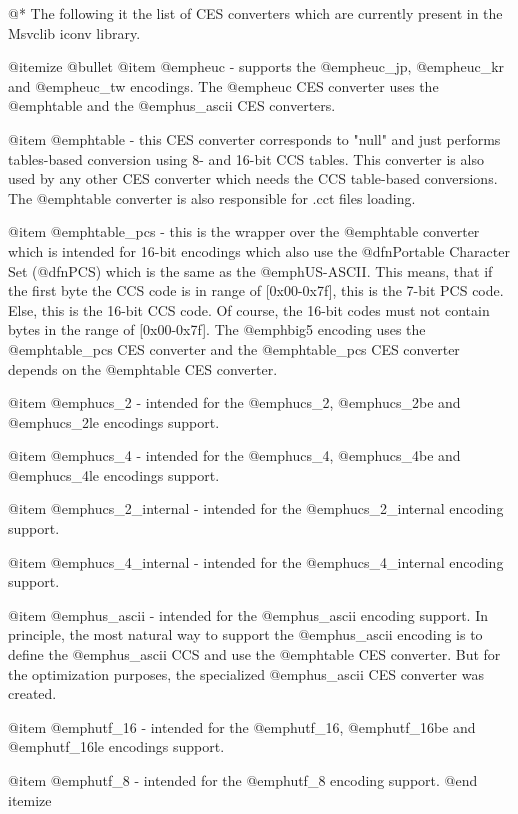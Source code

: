 @*
The following it the list of CES converters which are currently present
in the Msvclib iconv library.

@itemize @bullet
@item
@emph{euc} - supports the @emph{euc_jp}, @emph{euc_kr} and @emph{euc_tw}
encodings. The @emph{euc} CES converter uses the @emph{table} and the
@emph{us_ascii} CES converters.

@item
@emph{table} - this CES converter corresponds to "null" and just performs 
tables-based conversion using 8- and 16-bit CCS tables. This converter
is also used by any other CES converter which needs the CCS table-based
conversions. The @emph{table} converter is also responsible for .cct files
loading.

@item
@emph{table_pcs} - this is the wrapper over the @emph{table} converter
which is intended for 16-bit encodings which also use the @dfn{Portable
Character Set} (@dfn{PCS}) which is the same as the @emph{US-ASCII}.
This means, that if the first byte the CCS code is in range of [0x00-0x7f],
this is the 7-bit PCS code. Else, this is the 16-bit CCS code. Of course,
the 16-bit codes must not contain bytes in the range of [0x00-0x7f].
The @emph{big5} encoding uses the @emph{table_pcs} CES converter and the
@emph{table_pcs} CES converter depends on the @emph{table} CES converter.

@item
@emph{ucs_2} - intended for the @emph{ucs_2}, @emph{ucs_2be} and
@emph{ucs_2le} encodings support.

@item
@emph{ucs_4} - intended for the @emph{ucs_4}, @emph{ucs_4be} and
@emph{ucs_4le} encodings support.

@item
@emph{ucs_2_internal} - intended for the @emph{ucs_2_internal} encoding support.

@item
@emph{ucs_4_internal} - intended for the @emph{ucs_4_internal} encoding support.

@item
@emph{us_ascii} - intended for the @emph{us_ascii} encoding support. In
principle, the most natural way to support the @emph{us_ascii} encoding
is to define the @emph{us_ascii} CCS and use the @emph{table} CES
converter. But for the optimization purposes, the specialized
@emph{us_ascii} CES converter was created.

@item
@emph{utf_16} - intended for the @emph{utf_16}, @emph{utf_16be} and
@emph{utf_16le} encodings support.

@item
@emph{utf_8} - intended for the @emph{utf_8} encoding support.
@end itemize





